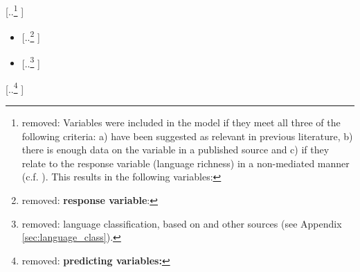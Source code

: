 \documentclass[unnumsec,webpdf,modern,medium]{oup-authoring-template}
\providecommand{\DIFdeltex}[1]{{\protect\color{red} [..\footnote{removed: #1} ]}} %
\providecommand{\DIFdelbegin}{} %
\providecommand{\DIFdel}[1]{\texorpdfstring{\DIFdeltex{#1}}{}} %
\newcommand{\DIFscaledelfig}{0.5}
\newlength{\DIFdelgraphicswidth} %
\newlength{\DIFdelgraphicsheight} %
\newcommand{\DIFdelincludegraphics}[2][]{%
\sbox{\DIFdelgraphicsbox}{\DIFOincludegraphics[#1]{#2}}%
\settoboxwidth{\DIFdelgraphicswidth}{\DIFdelgraphicsbox} %
\settoboxtotalheight{\DIFdelgraphicsheight}{\DIFdelgraphicsbox} %
\scalebox{\DIFscaledelfig}{%
\parbox[b]{\DIFdelgraphicswidth}{\usebox{\DIFdelgraphicsbox}\\[-\baselineskip] \rule{\DIFdelgraphicswidth}{0em}}\llap{\resizebox{\DIFdelgraphicswidth}{\DIFdelgraphicsheight}{%
\setlength{\unitlength}{\DIFdelgraphicswidth}%
\begin{picture}(1,1)%
\thicklines\linethickness{2pt} %
{\color[rgb]{1,0,0}\put(0,0){\framebox(1,1){}}}%
{\color[rgb]{1,0,0}\put(0,0){\line( 1,1){1}}}%
{\color[rgb]{1,0,0}\put(0,1){\line(1,-1){1}}}%
\end{picture}%
}\hspace*{3pt}}} %
} %
\DeclareRobustCommand{\DIFdelbegin}{\DIFOdelbegin \let\includegraphics\DIFdelincludegraphics} %
\begin{document}
\DIFdelbegin \DIFdel{Variables were included in the model if they meet all three of the following criteria: a) have been suggested as relevant in previous literature, b) there is enough data on the variable in a published source and c) if they relate to the response variable (language richness) in a non-mediated manner (c.f. \citet{pearl1995causal}). This results in the following variables:
}%

\begin{itemize}%
\item%
\DIFdel{\textbf{response variable}:
}%
\item%
\DIFdel{language classification, based on \citet{glottolog40} and other sources (see Appendix \ref{sec:language_class}).
}
\end{itemize}%
\DIFdel{\textbf{predicting variables:}
}%
\end{document}

